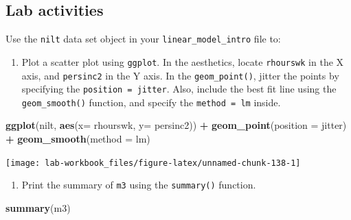 \documentclass[
]{book}
\newenvironment{Shaded}{\begin{snugshade}}{\end{snugshade}}
\newcommand{\AttributeTok}[1]{\textcolor[rgb]{0.13,0.29,0.53}{#1}}
\newcommand{\FunctionTok}[1]{\textcolor[rgb]{0.13,0.29,0.53}{\textbf{#1}}}
\newcommand{\NormalTok}[1]{#1}
\newcommand{\SpecialCharTok}[1]{\textcolor[rgb]{0.81,0.36,0.00}{\textbf{#1}}}
\newcommand{\StringTok}[1]{\textcolor[rgb]{0.31,0.60,0.02}{#1}}
\providecommand{\tightlist}{%
  \setlength{\itemsep}{0pt}\setlength{\parskip}{0pt}}
\begin{document}
\hypertarget{lab-activities-2}{%
\subsection{Lab activities}\label{lab-activities-2}}

Use the \texttt{nilt} data set object in your \texttt{linear\_model\_intro} file to:

\begin{enumerate}
\def\labelenumi{\arabic{enumi}.}
\tightlist
\item
  Plot a scatter plot using \texttt{ggplot}. In the aesthetics, locate \texttt{rhourswk} in the X axis, and \texttt{persinc2} in the Y axis. In the \texttt{geom\_point()}, jitter the points by specifying the \texttt{position\ =\ \textquotesingle{}jitter\textquotesingle{}}. Also, include the best fit line using the \texttt{geom\_smooth()} function, and specify the \texttt{method\ =\ \textquotesingle{}lm\textquotesingle{}} inside.
\end{enumerate}

\begin{Shaded}
\begin{Highlighting}[]
\FunctionTok{ggplot}\NormalTok{(nilt, }\FunctionTok{aes}\NormalTok{(}\AttributeTok{x=}\NormalTok{ rhourswk, }\AttributeTok{y=}\NormalTok{ persinc2)) }\SpecialCharTok{+}
  \FunctionTok{geom\_point}\NormalTok{(}\AttributeTok{position =} \StringTok{\textquotesingle{}jitter\textquotesingle{}}\NormalTok{) }\SpecialCharTok{+}
  \FunctionTok{geom\_smooth}\NormalTok{(}\AttributeTok{method =} \StringTok{\textquotesingle{}lm\textquotesingle{}}\NormalTok{)}
\end{Highlighting}
\end{Shaded}

\begin{flushleft}\texttt{[image: lab-workbook\_files/figure-latex/unnamed-chunk-138-1]} \end{flushleft}

\begin{enumerate}
\def\labelenumi{\arabic{enumi}.}
\setcounter{enumi}{1}
\tightlist
\item
  Print the summary of \texttt{m3} using the \texttt{summary()} function.
\end{enumerate}

\begin{Shaded}
\begin{Highlighting}[]
\FunctionTok{summary}\NormalTok{(m3)}
\end{Highlighting}
\end{Shaded}
\end{document}
